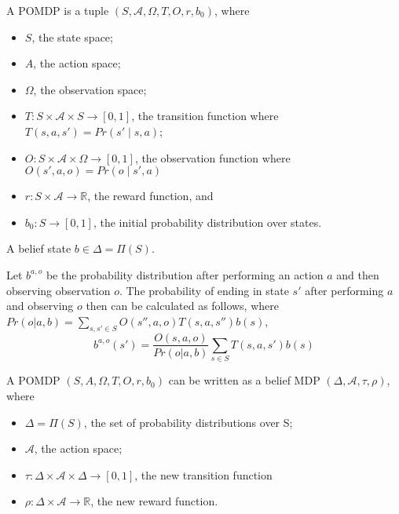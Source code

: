 \begin{definition}
	A POMDP is a tuple $(S, \mathcal{A}, \Omega, T, O, r, b_0)$, where
	\begin{itemize}
		\item $S$, the state space;
		\item $A$, the action space;
		\item $\Omega$, the observation space;
		\item $T:S\times \mathcal{A} \times S \to [0,1]$, the transition function where
			$T(s,a,s')=Pr(s'\mid s,a)$;
		\item $O:S\times \mathcal{A} \times \Omega \to [0,1]$, the observation function where
		$O(s',a,o)= Pr(o\mid s',a)$
		\item $r: S \times \mathcal{A} \to \mathds{R}$, the reward function, and 
		\item $b_0 : S \to [0,1]$, the initial probability distribution over states.
	\end{itemize}
\end{definition}



A belief state $b\in\Delta=\Pi(S)$.

\begin{definition}
Let $b^{a,o}$ be the probability distribution after performing an action $a$ and then observing observation $o$. The probability of ending in state $s'$ after performing $a$ and observing $o$ then can be calculated as follows, where $Pr(o|a,b)=\sum_{s,s'\in S}O(s'',a,o)T(s,a,s'')b(s)$,
\begin{equation}
	b^{a,o}(s')=\frac{O(s,a,o)}{Pr(o | a,b)}\sum_{s\in S} T(s,a,s')b(s)
\end{equation}
\end{definition}

\begin{definition}
	A POMDP $(S, A, \Omega, T, O, r, b_0)$ can be written as a belief MDP $(\Delta, \mathcal{A}, \tau, \rho)$, where
	\begin{itemize}
		\item $\Delta = \Pi(S)$, the set of probability distributions over S;
		\item $\mathcal{A}$, the action space;
		\item $\tau : \Delta \times \mathcal{A} \times \Delta \to [0,1]$, the new transition function
		\item $\rho: \Delta \times \mathcal{A} \to \mathds{R}$, the new reward function.
	\end{itemize}
\end{definition}

